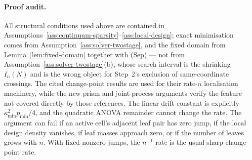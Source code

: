 \documentclass[11pt]{article}
\theoremstyle{plain}
\theoremstyle{definition}
\theoremstyle{remark}
\begin{document}
\paragraph{Proof audit.}
All structural conditions used above are contained in
Assumptions~\ref{ass:continuum-sparsity}--\ref{ass:local-design}; exact
minimisation comes from Assumption~\ref{ass:solver-twostage}, and the fixed
domain from Lemma~\ref{lem:fixed-domain} together with (Sep) --- not from
Assumption~\ref{ass:solver-twostage}(b), whose search interval is the
shrinking $I_n(N)$ and is the wrong object for Step~2's exclusion of
same-coordinate crossings.  The cited change-point
results are used for their rate-\(n\) localisation machinery, while the new
prism and joint-process arguments verify the feature not covered directly by
those references.  The linear drift constant is explicitly
\(\kappa_{\min}^2p_{\min}/4\), and the quadratic ANOVA remainder cannot change
the rate.  The argument can fail if an active cell's adjacent leaf pair has
zero jump, if
the local design density vanishes, if leaf masses approach zero, or if the
number of leaves grows with \(n\).  With fixed nonzero jumps, the \(n^{-1}\)
rate is the usual sharp change-point rate.
\end{document}
